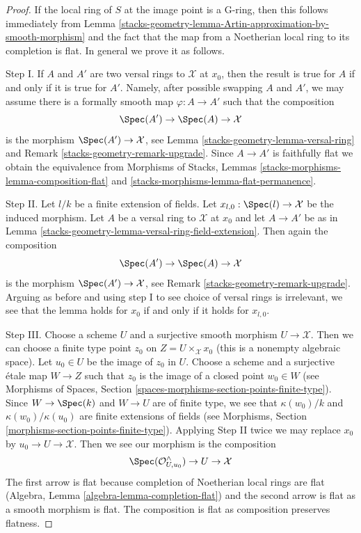 \begin{proof}
If the local ring of $S$ at the image point is a G-ring, then this
follows immediately from
Lemma \ref{stacks-geometry-lemma-Artin-approximation-by-smooth-morphism}
and the fact that the map from a Noetherian local ring to its
completion is flat. In general we prove it as follows.

\medskip\noindent
Step I. If $A$ and $A'$ are two versal rings to $\mathcal{X}$ at $x_0$,
then the result is true for $A$ if and only if it is true for $A'$.
Namely, after possible swapping $A$ and $A'$, we may assume there is
a formally smooth map $\varphi : A \to A'$ such that the composition
$$
\Spec(A') \to \Spec(A) \to \mathcal{X}
$$
is the morphism $\Spec(A') \to \mathcal{X}$, see
Lemma \ref{stacks-geometry-lemma-versal-ring} and
Remark \ref{stacks-geometry-remark-upgrade}.
Since $A \to A'$ is faithfully flat we obtain the equivalence from
Morphisms of Stacks, Lemmas \ref{stacks-morphisms-lemma-composition-flat} and
\ref{stacks-morphisms-lemma-flat-permanence}.

\medskip\noindent
Step II. Let $l/k$ be a finite extension of fields. Let
$x_{l, 0} : \Spec(l) \to \mathcal{X}$ be the induced morphism.
Let $A$ be a versal ring to $\mathcal{X}$ at $x_0$ and
let $A \to A'$ be as in Lemma \ref{stacks-geometry-lemma-versal-ring-field-extension}.
Then again the composition
$$
\Spec(A') \to \Spec(A) \to \mathcal{X}
$$
is the morphism $\Spec(A') \to \mathcal{X}$, see Remark \ref{stacks-geometry-remark-upgrade}.
Arguing as before and using step I to see choice of versal rings
is irrelevant, we see that the lemma holds for $x_0$ if and only
if it holds for $x_{l, 0}$.

\medskip\noindent
Step III. Choose a scheme $U$ and a surjective smooth morphism
$U \to \mathcal{X}$. Then we can choose a finite type point
$z_0$ on $Z = U \times_\mathcal{X} x_0$ (this is a nonempty
algebraic space). Let $u_0 \in U$ be the image of $z_0$ in $U$.
Choose a scheme and a surjective \'etale map $W \to Z$
such that $z_0$ is the image of a closed point $w_0 \in W$
(see Morphisms of Spaces, Section
\ref{spaces-morphisms-section-points-finite-type}).
Since $W \to \Spec(k)$ and $W \to U$ are of finite type,
we see that $\kappa(w_0)/k$ and $\kappa(w_0)/\kappa(u_0)$
are finite extensions of fields
(see Morphisms, Section \ref{morphisms-section-points-finite-type}).
Applying Step II twice we may replace $x_0$ by
$u_0 \to U \to \mathcal{X}$. Then we see our morphism is the composition
$$
\Spec(\mathcal{O}_{U, u_0}^\wedge) \to U \to \mathcal{X}
$$
The first arrow is flat because completion of Noetherian local rings
are flat (Algebra, Lemma \ref{algebra-lemma-completion-flat})
and the second arrow is flat as
a smooth morphism is flat. The composition is flat as composition
preserves flatness.
\end{proof}

